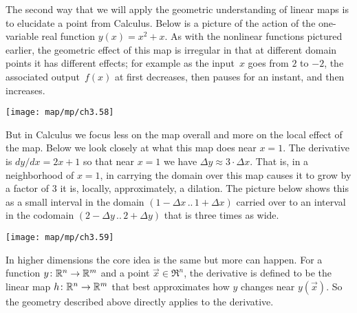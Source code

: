 The second way that we will apply 
the geometric understanding of linear maps 
is to elucidate a point from Calculus.
Below is a picture
of the action of the one-variable real function \( y(x)=x^2+x \).
As with the nonlinear functions pictured earlier, 
the geometric effect of this map is
irregular in that at different domain points it has different effects; for
example as the input~$x$ goes from $2$ to $-2$, the associated output~$f(x)$ 
at first decreases, then pauses for an instant,
and then increases.
\begin{center}
  \texttt{[image: map/mp/ch3.58]}
\end{center}
But in Calculus we focus less on the map overall and more 
on the local effect of the map.
Below we look closely at what this map
does near $x=1$.
The derivative is $dy/dx=2x+1$
so that near \( x=1 \) 
we have \( \Delta y\approx 3\cdot\Delta x \).
That is, in a neighborhood of $x=1$,
in carrying the domain over this map causes it to grow by
a factor of $3$ \Dash  it is, locally, 
approximately, a dilation.
The picture below shows this as a small interval 
in the domain $(1-\Delta x\,..\,1+\Delta x)$
carried over to an interval in the codomain $(2-\Delta y\,..\,2+\Delta y)$
that is three times as wide. %
\begin{center}
  \texttt{[image: map/mp/ch3.59]}
\end{center}

In higher dimensions the core idea is the same but more can happen.
For a function \( \mbox{$y\colon \mathbb{R}^n\to \mathbb{R}^m$} \) and a point \( \vec{x}\in\Re^n \),
the derivative is defined to be the 
linear map \( \mbox{$h\colon \mathbb{R}^n\to \mathbb{R}^m$} \) that best approximates
how \( y \) changes near \( y(\vec{x}) \).
So the geometry described above directly applies to the derivative.

